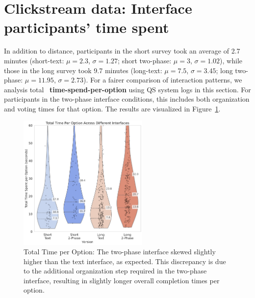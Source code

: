 \section{Clickstream data: Interface participants' time spent}
In addition to distance, participants in the short survey took an average of 2.7 minutes (short-text: $\mu=2.3$, $\sigma=1.27$; short two-phase: $\mu=3$, $\sigma=1.02$), while those in the long survey took 9.7 minutes (long-text: $\mu=7.5$, $\sigma=3.45$; long two-phase: $\mu=11.95$, $\sigma=2.73$). For a fairer comparison of interaction patterns, we analysis total ~\textbf{time-spend-per-option} using QS system logs in this section. For participants in the two-phase interface conditions, this includes both organization and voting times for that option. The results are visualized in Figure~\ref{fig:total_time}.

\begin{figure}[h]
    \centering
    \includegraphics[width=0.57\textwidth, trim=0 0 0 0, clip]{content/image/time/Total Time Per Option Across Different Interfaces.pdf}
    \captionsetup{width=0.7\textwidth, justification=justified}
    \caption{Total Time per Option: The two-phase interface skewed slightly higher than the text interface, as expected. This discrepancy is due to the additional organization step required in the two-phase interface, resulting in slightly longer overall completion times per option.}
    \label{fig:total_time}
\end{figure}

